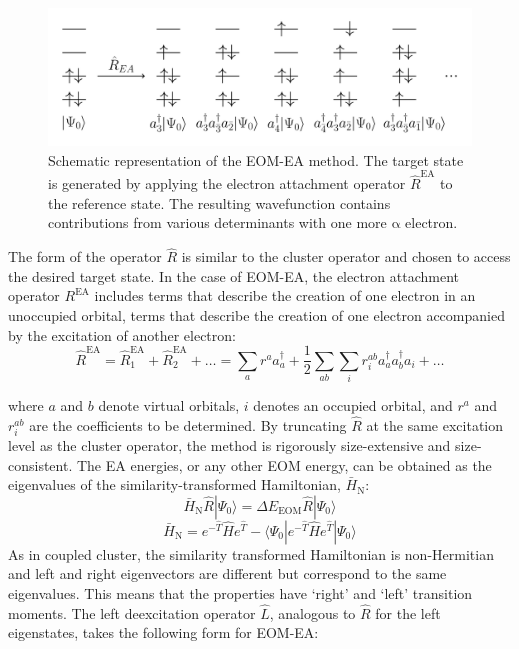 \begin{figure}
    \centering
    \medskip
    \includegraphics[width=.8\textwidth]{chapters/theory/image/EOM_EA}
    \caption[EOM-EA]{Schematic representation of the EOM-EA method. The target state is generated by applying the electron attachment operator $\hat{R}^{\mathrm{EA}}$ to the reference state. The resulting wavefunction contains contributions from various determinants with one more $\mathrm{\alpha}$ electron.}
    \label{fig:EOM}
\end{figure}

The form of the operator $\hat{R}$ is similar to the cluster operator and chosen to access the desired target state. In the case of EOM-EA, the electron attachment operator $R^{\text{EA}}$ includes terms that describe the creation of one electron in an unoccupied orbital, terms that describe the creation of one electron accompanied by the excitation of another electron:
\begin{equation}\label{eq:R_EA}
    \hat{R}^{\mathrm{EA}} = \hat{R}_1^{\mathrm{EA}} + \hat{R}_2^{\mathrm{EA}} + \ldots = \sum_{a} r^a a_a^{\dagger} + \frac{1}{2}\sum_{ab} \sum_{i} r^{ab}_{i} a_a^{\dagger} a_b^{\dagger} a_i + \ldots
\end{equation}

where $a$ and $b$ denote virtual orbitals, $i$ denotes an occupied orbital, and $r^a$ and $r^{ab}_{i}$ are the coefficients to be determined. By truncating $\hat{R}$ at the same excitation level as the cluster operator, the method is rigorously size-extensive and size-consistent. The EA energies, or any other EOM energy, can be obtained as the eigenvalues of the similarity-transformed Hamiltonian, $\bar{H}_{\mathrm{N}}$:
\begin{equation}
    \bar{H}_{\mathrm{N}} \hat{R} | \Psi_0 \rangle = \Delta E_{\mathrm{EOM}} \hat{R} | \Psi_0 \rangle
\end{equation}
\begin{equation}
    \bar{H}_{\mathrm{N}} = e^{-\hat{T}} \hat{H} e^{\hat{T}} - \langle \Psi_0 | e^{-\hat{T}} \hat{H} e^{\hat{T}} | \Psi_0 \rangle
\end{equation}
As in coupled cluster, the similarity transformed Hamiltonian is non-Hermitian and left and right eigenvectors are different but correspond to the same eigenvalues. This means that the properties have `right' and `left' transition moments. The left deexcitation operator $\hat{L}$, analogous to $\hat{R}$ for the left eigenstates, takes the following form for EOM-EA:

